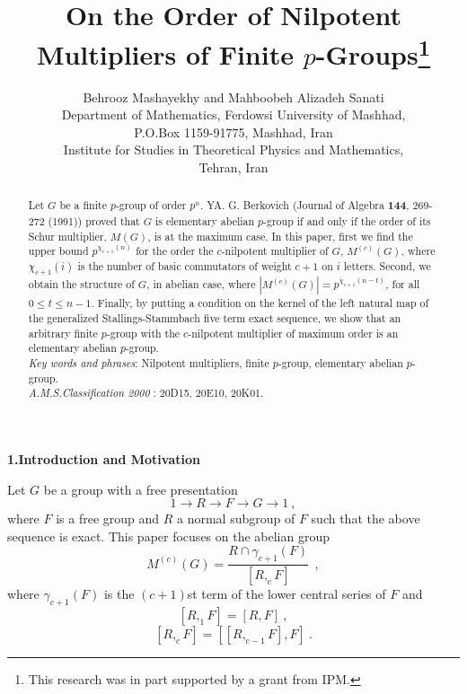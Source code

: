 \renewcommand{\baselinestretch}{1.3}

\newcommand{\ol }{\overline}
\newcommand{\ul }{\underline }
\newcommand{\ra }{\rightarrow }
\newcommand{\lra }{\longrightarrow }
\newcommand{\ga }{\gamma }
\newcommand{\st }{\stackrel }
\newcommand{\scr }{\scriptsize }
\title{{\Large\bf On the Order of Nilpotent Multipliers of Finite
$p$-Groups}\footnote{This research was in part supported by a
grant from IPM.}}
\author{ Behrooz Mashayekhy and Mahboobeh Alizadeh Sanati \\
Department of Mathematics, Ferdowsi University of Mashhad,\\
P.O.Box 1159-91775, Mashhad, Iran \\
Institute for Studies in Theoretical Physics and Mathematics, \\
Tehran, Iran}
\date{ }
\maketitle
\begin{abstract}
Let $G$ be a finite $p$-group of order $p^n$. YA. G. Berkovich
(Journal of Algebra {\bf 144}, 269-272 (1991)) proved that $G$ is
elementary abelian $p$-group if and only if the order of its
Schur multiplier, $M(G)$, is at the maximum case. In this paper,
first we find the upper bound $p^{\chi_{c+1}{(n)}}$ for the order
the $c$-nilpotent multiplier of $G$, $M^{(c)}(G)$, where
$\chi_{c+1}{(i)}$ is the number of basic commutators of weight
$c+1$ on $i$ letters. Second, we obtain the structure of $G$, in
abelian case, where $|M^{(c)}(G)|=p^{\chi_{c+1}{(n-t)}}$, for all
$0\leq t\leq n-1$. Finally, by putting a condition on the kernel
of the left natural map of the generalized Stallings-Stammbach
five term exact sequence, we show that an arbitrary finite
$p$-group with the $c$-nilpotent multiplier of maximum order is
an elementary abelian $p$-group.\\
{\it Key words and phrases}: Nilpotent multipliers, finite
$p$-group, elementary abelian $p$-group.\\ {\it
A.M.S.Classification 2000} : 20D15, 20E10, 20K01.
\end{abstract}
{\bf 1.Introduction and Motivation}

 Let $G$ be a group with a free presentation
$$ 1\lra R\lra F\lra G\lra 1\ ,$$
where $F$ is a free group and $R$ a normal subgroup of $F$ such that the above
sequence is exact. This paper focuses on the abelian group
$$ M^{(c)}(G)=\frac {R\cap \ga_{c+1}(F)}{[R, _cF]}\ \ ,$$
where $ \ga_{c+1}(F)$ is the $(c+1)$st term of the lower central series of $F$ and
$$ [R, _1F]=[R,F]\ ,$$
$$ [R, _cF]=[[R, _{c-1}F],F]\ .$$

